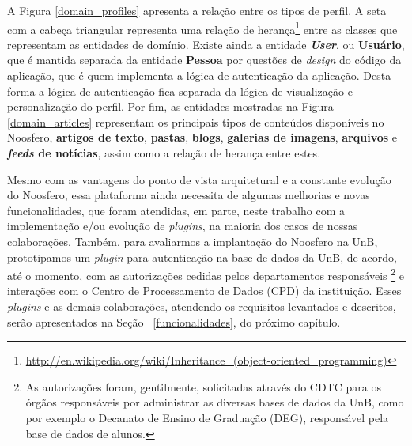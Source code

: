 A Figura \ref{domain_profiles} apresenta a relação entre os tipos de perfil.
A seta com a cabeça triangular representa uma relação de herança\footnote{%
\url{http://en.wikipedia.org/wiki/Inheritance_(object-oriented_programming)}}
entre as classes que representam as entidades de domínio.
%
Existe ainda a entidade \textbf{\textit{User}}, ou \textbf{Usuário}, que é
mantida separada da entidade \textbf{Pessoa} por questões de \textit{design}
do código da aplicação, que é quem implementa a lógica de autenticação da
aplicação.
%
Desta forma a lógica de autenticação fica separada da lógica de
visualização e personalização do perfil.
%
Por fim, as entidades mostradas na Figura \ref{domain_articles} representam os
principais tipos de conteúdos disponíveis no Noosfero, \textbf{artigos
de texto}, \textbf{pastas}, \textbf{blogs}, \textbf{galerias de imagens},
\textbf{arquivos} e \textbf{\textit{feeds} de notícias}, assim como a
relação de herança entre estes.

Mesmo com as vantagens do ponto de vista arquitetural e a constante evolução do Noosfero,
essa plataforma ainda necessita de algumas melhorias e novas funcionalidades, que foram
atendidas, em parte, neste trabalho com a implementação e/ou evolução de \textit{plugins}, na
maioria dos casos de nossas colaborações.
%
Também, para avaliarmos a implantação do Noosfero na UnB, prototipamos um \textit{plugin} para autenticação
na base de dados da UnB, de acordo, até o momento, com as autorizações cedidas pelos departamentos responsáveis%
\footnote{As autorizações foram, gentilmente, solicitadas através do CDTC para os órgãos responsáveis por administrar
as diversas bases de dados da UnB, como por exemplo o Decanato de Ensino de Graduação (DEG), responsável pela
base de dados de alunos.} e interações com o Centro de Processamento de Dados (CPD) da instituição. Esses
\textit{plugins} e as demais colaborações, atendendo os requisitos levantados e descritos, serão apresentados na Seção
~\ref{funcionalidades}, do próximo capítulo.

